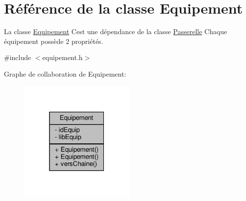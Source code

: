 \hypertarget{class_equipement}{}\section{Référence de la classe Equipement}
\label{class_equipement}


La classe \hyperlink{class_equipement}{Equipement} C\textquotesingle{}est une dépendance de la classe \hyperlink{class_passerelle}{Passerelle} Chaque équipement possède 2 propriétés.  




{\ttfamily \#include $<$equipement.\+h$>$}



Graphe de collaboration de Equipement\+:\nopagebreak
\begin{figure}[H]
\begin{center}
\leavevmode
\includegraphics[width=163pt]{class_equipement__coll__graph}
\end{center}
\end{figure}

